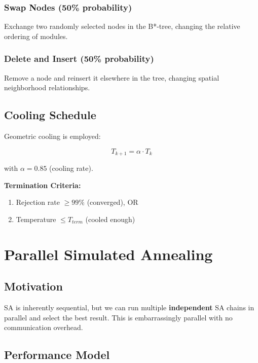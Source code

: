\documentclass[11pt]{article}
\begin{document}
\subsubsection{Swap Nodes (50\% probability)}

Exchange two randomly selected nodes in the B*-tree, changing the relative ordering of modules.

\subsubsection{Delete and Insert (50\% probability)}

Remove a node and reinsert it elsewhere in the tree, changing spatial neighborhood relationships.

\subsection{Cooling Schedule}

Geometric cooling is employed:

\begin{equation}
T_{k+1} = \alpha \cdot T_k
\end{equation}

with $\alpha = 0.85$ (cooling rate).

\textbf{Termination Criteria:}
\begin{enumerate}
    \item Rejection rate $\geq 99\%$ (converged), OR
    \item Temperature $\leq T_{term}$ (cooled enough)
\end{enumerate}

\section{Parallel Simulated Annealing}

\subsection{Motivation}

SA is inherently sequential, but we can run multiple \textbf{independent} SA chains in parallel and select the best result. This is embarrassingly parallel with no communication overhead.

\subsection{Performance Model}
\end{document}

